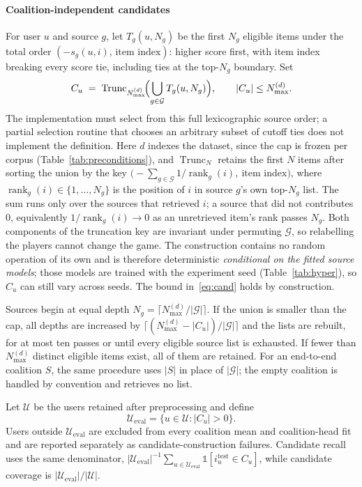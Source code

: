 \documentclass[pdflatex,sn-basic,Numbered]{sn-jnl}
\theoremstyle{plain}
\theoremstyle{definition}
\newcommand{\G}{\mathcal{G}}
\newcommand{\Cu}{C_u}
\newcommand{\Ueval}{\mathcal{U}_{\mathrm{eval}}}
\begin{document}
\paragraph{Coalition-independent candidates}

For user $u$ and source $g$, let $T_g(u,N_g)$ be the first $N_g$ eligible items
under the total order
$(-s_g(u,i),\,\text{item index})$: higher score first, with item index breaking
every score tie, including ties at the top-$N_g$ boundary. Set
\begin{equation}
\Cu \;=\; \operatorname{Trunc}_{N_{\max}^{(d)}}\!\Bigl(
\bigcup_{g \in \G} T_g(u,N_g) \Bigr),
\qquad |\Cu| \le N_{\max}^{(d)} .
\label{eq:cand}
\end{equation}
The implementation must select from this full lexicographic source order; a
partial selection routine that chooses an arbitrary subset of cutoff ties does
not implement the definition.
Here $d$ indexes the dataset, since the cap is frozen per corpus
(Table~\ref{tab:preconditions}), and $\operatorname{Trunc}_{N}$ retains the
first $N$ items after sorting the union by the key
$\bigl(-\sum_{g \in \G} 1/\operatorname{rank}_g(i),\ \text{item index}\bigr)$,
where $\operatorname{rank}_g(i) \in \{1, \dots, N_g\}$ is the position of $i$ in
source $g$'s own top-$N_g$ list. The sum runs only over the sources that
retrieved $i$; a source that did not contributes $0$, equivalently
$1/\operatorname{rank}_g(i) \to 0$ as an unretrieved item's rank passes
$N_g$. Both components of the truncation key are invariant under permuting
$\G$, so relabelling the players cannot change the game. The construction
contains no random operation of its own and is therefore deterministic
\emph{conditional on the fitted source models}; those models are trained with
the experiment seed (Table~\ref{tab:hyper}), so $\Cu$ can still vary across
seeds. The bound in~\eqref{eq:cand} holds by construction.

Sources begin at equal depth
$N_g=\lceil N_{\max}^{(d)}/|\G|\rceil$. If the union is smaller than the cap,
all depths are increased by
$\lceil(N_{\max}^{(d)}-|C_u|)/|\G|\rceil$ and the lists are rebuilt, for at
most ten passes or until every eligible source list is exhausted. If fewer
than $N_{\max}^{(d)}$ distinct eligible items exist, all of them are retained.
For an end-to-end coalition $S$, the same procedure uses $|S|$ in place of
$|\G|$; the empty coalition is handled by convention and retrieves no list.

Let $\mathcal U$ be the users retained after preprocessing and define
\begin{equation}
\Ueval = \{u\in\mathcal U: |C_u|>0\}.
\label{eq:ueval}
\end{equation}
Users outside $\Ueval$ are excluded from every coalition mean and coalition-head
fit and are reported separately as candidate-construction failures. Candidate
recall uses the same denominator,
$|\Ueval|^{-1}\sum_{u\in\Ueval}\mathbb 1[i_u^{\mathrm{test}}\in C_u]$, while
candidate coverage is $|\Ueval|/|\mathcal U|$.
\end{document}
